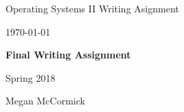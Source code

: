 \documentclass[onecolumn, draftclsnofoot,10pt, compsoc]{IEEEtran}
\def \CapstoneTeamName{		The Cleverly Named Team}
\def \CapstoneTeamNumber{		Spring 2018}
\def \GroupMemberOne{			Megan McCormick}
\def \CapstoneProjectName{		Final Writing Assignment}
\def \CapstoneSponsorCompany{	Cheap Robots, Inc}
\def \CapstoneSponsorPerson{		Roger Bacon}
\def \DocType{		%
        Writing Asignment
				}
\newcommand{\NameSigPair}[1]{\par
\makebox[2.75in][r]{#1} \hfil 	\makebox[3.25in]{\makebox[2.25in]{\hrulefill} \hfill		\makebox[.75in]{\hrulefill}}
\par\vspace{-12pt} \textit{\tiny\noindent
\makebox[2.75in]{} \hfil		\makebox[3.25in]{\makebox[2.25in][r]{Signature} \hfill	\makebox[.75in][r]{Date}}}}
\renewcommand{\NameSigPair}[1]{#1}
\begin{document}
\begin{titlepage}
    \begin{singlespace}
        \hfill 
        \par\vspace{.2in}
        \centering
        \scshape{
            \huge Operating Systems II \DocType \par
            {\large\today}\par
            \vspace{.5in}
            \textbf{\Huge\CapstoneProjectName}\par
            \vfill
            \CapstoneTeamNumber\par
            \vspace{5pt}
            {\Large
                \NameSigPair{\GroupMemberOne}\par
            }
            \vspace{20pt}
        }
    \end{singlespace}
\end{titlepage}
\newpage
{}
\end{document}
